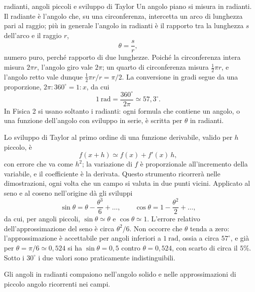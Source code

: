 \documentclass[main.tex]{subfiles}
\begin{document}
\renewcommand{\richiamoprefix}{Richiamo di Matematica --- }
\begin{riquadro}{radianti, angoli piccoli e sviluppo di Taylor}
Un angolo piano si misura in radianti. Il radiante è l'angolo che, su una circonferenza, intercetta un arco di lunghezza pari al raggio; più in generale l'angolo in radianti è il rapporto tra la lunghezza $s$ dell'arco e il raggio $r$,
\[
\theta=\frac{s}{r},
\]
numero puro, perché rapporto di due lunghezze. Poiché la circonferenza intera misura $2\pi r$, l'angolo giro vale $2\pi$; un quarto di circonferenza misura $\tfrac12\pi r$, e l'angolo retto vale dunque $\tfrac12\pi r/r=\pi/2$. La conversione in gradi segue da una proporzione, $2\pi:360^\circ=1:x$, da cui
\[
1\ \mathrm{rad}=\frac{360^\circ}{2\pi}\simeq 57{,}3^\circ .
\]
In Fisica 2 si usano soltanto i radianti: ogni formula che contiene un angolo, o una funzione dell'angolo con sviluppo in serie, è scritta per $\theta$ in radianti.

Lo sviluppo di Taylor al primo ordine di una funzione derivabile, valido per $h$ piccolo, è
\[
f(x+h)\simeq f(x)+f'(x)\,h ,
\]
con errore che va come $h^2$; la variazione di $f$ è proporzionale all'incremento della variabile, e il coefficiente è la derivata. Questo strumento ricorrerà nelle dimostrazioni, ogni volta che un campo si valuta in due punti vicini. Applicato al seno e al coseno nell'origine dà gli sviluppi
\[
\sin\theta=\theta-\frac{\theta^3}{6}+\dots,\qquad \cos\theta=1-\frac{\theta^2}{2}+\dots,
\]
da cui, per angoli piccoli, $\sin\theta\simeq\theta$ e $\cos\theta\simeq1$. L'errore relativo dell'approssimazione del seno è circa $\theta^2/6$. Non occorre che $\theta$ tenda a zero: l'approssimazione è accettabile per angoli inferiori a $1\ \mathrm{rad}$, ossia a circa $57^\circ$, e già per $\theta=\pi/6\simeq0{,}524$ si ha $\sin\theta=0{,}5$ contro $\theta=0{,}524$, con scarto di circa il $5\%$. Sotto i $30^\circ$ i due valori sono praticamente indistinguibili.

Gli angoli in radianti compaiono nell'angolo solido e nelle approssimazioni di piccolo angolo ricorrenti nei campi.
\end{riquadro}
\end{document}
